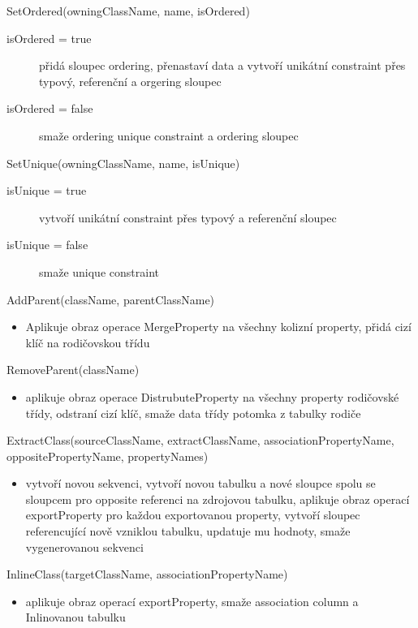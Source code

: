 \documentclass[11pt,twoside,a4paper]{book}
\begin{document}
\begin{list}{Operace :}{}
  \item SetOrdered(owningClassName, name, isOrdered)
  \begin{description}
  	\item[isOrdered = true] přidá sloupec ordering, přenastaví data a vytvoří
  	unikátní constraint přes typový, referenční a orgering sloupec
	\item[isOrdered = false] smaže ordering unique constraint a ordering sloupec 
  \end{description}

  \item SetUnique(owningClassName, name, isUnique)
  \begin{description}
  	\item[isUnique = true] vytvoří unikátní constraint přes typový a referenční
  	sloupec
	\item[isUnique = false] smaže unique constraint
  \end{description}
  
  \item AddParent(className, parentClassName)
  \begin{itemize}
    \item Aplikuje obraz operace MergeProperty na všechny kolizní property,
	přidá cizí klíč na rodičovskou třídu
  \end{itemize}

  \item RemoveParent(className)
  \begin{itemize}
    \item aplikuje obraz operace DistrubuteProperty na všechny property
	rodičovské třídy, odstraní cizí klíč, smaže data třídy potomka z tabulky
	rodiče
  \end{itemize}

  \item ExtractClass(sourceClassName, extractClassName, associationPropertyName,
  oppositePropertyName, propertyNames)
  \begin{itemize}
    \item vytvoří novou sekvenci, vytvoří novou
    tabulku a nové sloupce spolu se sloupcem pro opposite referenci na
    zdrojovou tabulku, aplikuje obraz operací exportProperty pro každou
    exportovanou property, vytvoří sloupec referencující nově vzniklou tabulku, updatuje
    mu hodnoty, smaže vygenerovanou sekvenci
  \end{itemize}
  
  \item InlineClass(targetClassName, associationPropertyName)
  \begin{itemize}
    \item aplikuje obraz operací exportProperty, smaže association column a
	Inlinovanou tabulku
  \end{itemize}


\end{list}
\end{document}
